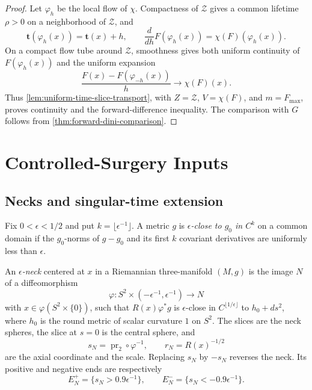 \begin{proof}
Let $\varphi_h$ be the local flow of $\chi$.  Compactness of $\mathcal Z$
gives a common lifetime $\rho>0$ on a neighborhood of $\mathcal Z$, and
\[
 \mathbf t(\varphi_h(x))=\mathbf t(x)+h,
 \qquad
 \frac{d}{dh}F(\varphi_h(x))=\chi(F)(\varphi_h(x)).
\]
On a compact flow tube around $\mathcal Z$, smoothness gives both uniform
continuity of $F(\varphi_h(x))$ and the uniform expansion
\[
 \frac{F(x)-F(\varphi_{-h}(x))}{h}\longrightarrow\chi(F)(x).
\]
Thus \ref{lem:uniform-time-slice-transport}, with
$Z=\mathcal Z$, $V=\chi(F)$, and $m=F_{\max}$, proves continuity and the
forward-difference inequality.  The comparison with $G$ follows from
\ref{thm:forward-dini-comparison}.
\end{proof}

\section{Controlled-Surgery Inputs}

\subsection{Necks and singular-time extension}

\begin{definition}
\label{def:epsilon-neck-and-scale}
\notready
Fix $0<\epsilon<1/2$ and put $k=\lfloor\epsilon^{-1}\rfloor$.  A metric
$g$ is \emph{$\epsilon$-close to $g_0$ in $C^k$} on a common domain if
the $g_0$-norms of $g-g_0$ and its first $k$ covariant derivatives are
uniformly less than $\epsilon$.

An \emph{$\epsilon$-neck} centered at $x$ in a Riemannian three-manifold
$(M,g)$ is the image $N$ of a diffeomorphism
\[
 \varphi\colon S^2\times(-\epsilon^{-1},\epsilon^{-1})\longrightarrow N
\]
with $x\in\varphi(S^2\times\{0\})$, such that
$R(x)\varphi^*g$ is $\epsilon$-close in
$C^{\lfloor1/\epsilon\rfloor}$ to $h_0+ds^2$, where $h_0$ is the round
metric of scalar curvature $1$ on $S^2$.  The slices are the neck spheres,
the slice at $s=0$ is the central sphere, and
\[
 s_N=\operatorname{pr}_2\circ\varphi^{-1},
 \qquad r_N=R(x)^{-1/2}
\]
are the axial coordinate and the scale.  Replacing $s_N$ by $-s_N$
reverses the neck.  Its positive and negative ends are respectively
\[
 E_N^+=\{s_N>0.9\epsilon^{-1}\},
 \qquad
 E_N^-=\{s_N<-0.9\epsilon^{-1}\}.
\]
\end{definition}

